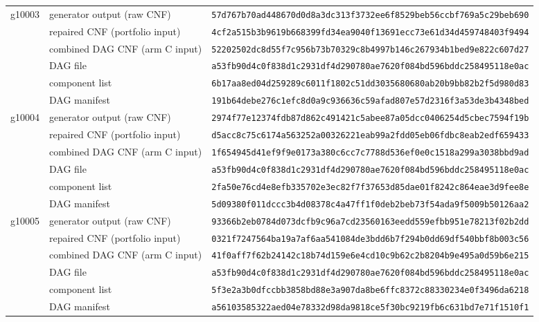 \documentclass[11pt,a4paper]{article}
\begin{document}
{\begin{longtable}{@{}lll@{}}
\addlinespace
g10003 & generator output (raw CNF) & \texttt{57d767b70ad448670d0d8a3dc313f3732ee6f8529beb56ccbf769a5c29beb690}\\
 & repaired CNF (portfolio input) & \texttt{4cf2a515b3b9619b668399fd34ea9040f13691ecc73e61d34d459748403f9494}\\
 & combined DAG CNF (arm C input) & \texttt{52202502dc8d55f7c956b73b70329c8b4997b146c267934b1bed9e822c607d27}\\
 & DAG file & \texttt{a53fb90d4c0f838d1c2931df4d290780ae7620f084bd596bddc258495118e0ac}\\
 & component list & \texttt{6b17aa8ed04d259289c6011f1802c51dd3035680680ab20b9bb82b2f5d980d83}\\
 & DAG manifest & \texttt{191b64debe276c1efc8d0a9c936636c59afad807e57d2316f3a53de3b4348bed}\\
\addlinespace
g10004 & generator output (raw CNF) & \texttt{2974f77e12374fdb87d862c491421c5abee87a05dcc0406254d5cbec7594f19b}\\
 & repaired CNF (portfolio input) & \texttt{d5acc8c75c6174a563252a00326221eab99a2fdd05eb06fdbc8eab2edf659433}\\
 & combined DAG CNF (arm C input) & \texttt{1f654945d41ef9f9e0173a380c6cc7c7788d536ef0e0c1518a299a3038bbd9ad}\\
 & DAG file & \texttt{a53fb90d4c0f838d1c2931df4d290780ae7620f084bd596bddc258495118e0ac}\\
 & component list & \texttt{2fa50e76cd4e8efb335702e3ec82f7f37653d85dae01f8242c864eae3d9fee8e}\\
 & DAG manifest & \texttt{5d09380f011dccc3b4d08378c4a47ff1f0deb2beb73f54ada9f5009b50126aa2}\\
\addlinespace
g10005 & generator output (raw CNF) & \texttt{93366b2eb0784d073dcfb9c96a7cd23560163eedd559efbb951e78213f02b2dd}\\
 & repaired CNF (portfolio input) & \texttt{0321f7247564ba19a7af6aa541084de3bdd6b7f294b0dd69df540bbf8b003c56}\\
 & combined DAG CNF (arm C input) & \texttt{41f0aff7f62b24142c18b74d159e6e4cd10c9b62c2b8204b9e495a0d59b6e215}\\
 & DAG file & \texttt{a53fb90d4c0f838d1c2931df4d290780ae7620f084bd596bddc258495118e0ac}\\
 & component list & \texttt{5f3e2a3b0dfccbb3858bd88e3a907da8be6ffc8372c88330234e0f3496da6218}\\
 & DAG manifest & \texttt{a56103585322aed04e78332d98da9818ce5f30bc9219fb6c631bd7e71f1510f1}\\
\bottomrule
\end{longtable}}
\end{document}
